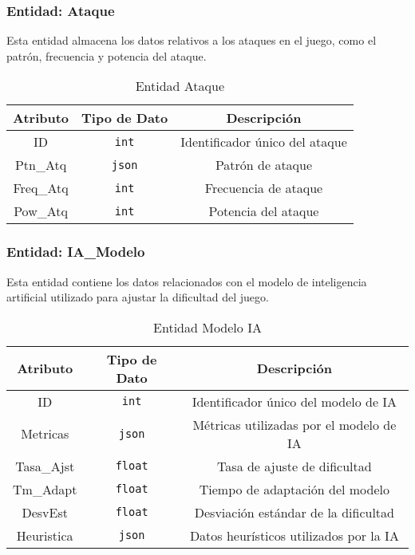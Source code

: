\subsubsection{Entidad: Ataque}
Esta entidad almacena los datos relativos a los ataques en el juego, como el patrón, frecuencia y potencia del ataque.
\begin{table}[H]
\centering
\begin{tabular}{|c|c|c|}
\hline
\textbf{Atributo} & \textbf{Tipo de Dato} & \textbf{Descripción} \\ \hline
ID & \texttt{int} & Identificador único del ataque \\ \hline
Ptn\_Atq & \texttt{json} & Patrón de ataque \\ \hline
Freq\_Atq & \texttt{int} & Frecuencia de ataque \\ \hline
Pow\_Atq & \texttt{int} & Potencia del ataque \\ \hline
\end{tabular}
\caption{Entidad Ataque}
\end{table}

\subsubsection{Entidad: IA\_Modelo}
Esta entidad contiene los datos relacionados con el modelo de inteligencia artificial utilizado para ajustar la dificultad del juego.
\begin{table}[H]
\centering
\begin{tabular}{|c|c|c|}
\hline
\textbf{Atributo} & \textbf{Tipo de Dato} & \textbf{Descripción} \\ \hline
ID & \texttt{int} & Identificador único del modelo de IA \\ \hline
Metricas & \texttt{json} & Métricas utilizadas por el modelo de IA \\ \hline
Tasa\_Ajst & \texttt{float} & Tasa de ajuste de dificultad \\ \hline
Tm\_Adapt & \texttt{float} & Tiempo de adaptación del modelo \\ \hline
DesvEst & \texttt{float} & Desviación estándar de la dificultad \\ \hline
Heuristica & \texttt{json} & Datos heurísticos utilizados por la IA \\ \hline
\end{tabular}
\caption{Entidad Modelo IA}
\end{table}

